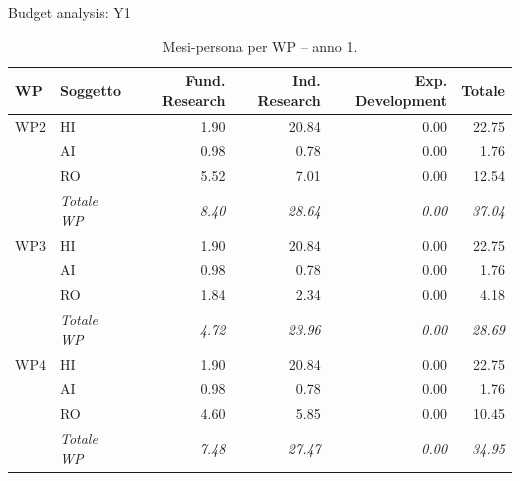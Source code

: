 \documentclass[aspectratio=169,11pt]{beamer}
\begin{document}
\begin{frame}{Budget analysis: Y1}
  
\begin{table}[H]\centering\scriptsize\caption{Mesi-persona per WP -- anno 1.}\label{tab:wp-w-y1}
\begin{tabular}{llrrrr}\toprule\textbf{WP} & \textbf{Soggetto} & \textbf{Fund. Research} & \textbf{Ind. Research} & \textbf{Exp. Development} & \textbf{Totale} \\\midrule
WP2 & HI & 1.90 & 20.84 & 0.00 & 22.75 \\
 & AI & 0.98 & 0.78 & 0.00 & 1.76 \\
 & RO & 5.52 & 7.01 & 0.00 & 12.54 \\
 & \textit{Totale WP} & \textit{8.40} & \textit{28.64} & \textit{0.00} & \textit{37.04} \\\midrule
WP3 & HI & 1.90 & 20.84 & 0.00 & 22.75 \\
 & AI & 0.98 & 0.78 & 0.00 & 1.76 \\
 & RO & 1.84 & 2.34 & 0.00 & 4.18 \\
 & \textit{Totale WP} & \textit{4.72} & \textit{23.96} & \textit{0.00} & \textit{28.69} \\\midrule
WP4 & HI & 1.90 & 20.84 & 0.00 & 22.75 \\
 & AI & 0.98 & 0.78 & 0.00 & 1.76 \\
 & RO & 4.60 & 5.85 & 0.00 & 10.45 \\
 & \textit{Totale WP} & \textit{7.48} & \textit{27.47} & \textit{0.00} & \textit{34.95} \\
\bottomrule\end{tabular}
\end{table}
\end{frame}
\end{document}
